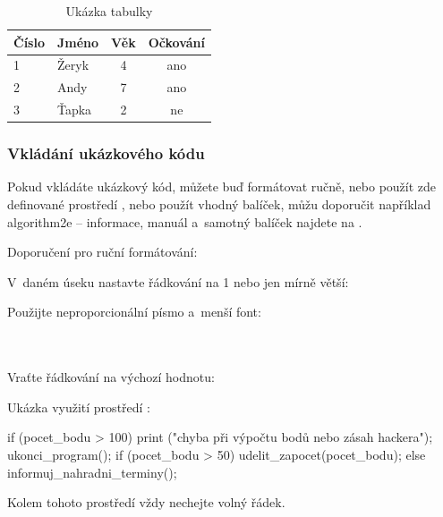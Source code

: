 \begin{table}[htb]
	\centering
	\caption{Ukázka tabulky}
	\medskip
	\radkovani[1.2]
		\begin{tabular}{@{}l||l|c|c@{}}\hline
			\textbf{Číslo} & \textbf{Jméno} & \textbf{Věk} & \textbf{Očkování}\\ \hline\hline
			1	&Žeryk&	4	&ano\\ \hline
			2	&Andy&	7	&ano\\ \hline
			3	&Ťapka&	2	&ne\\ \hline			
		\end{tabular}
	\label{tab:ukazkatabulky}
\end{table}


\subsubsection{Vkládání ukázkového kódu}

Pokud vkládáte ukázkový kód, můžete buď formátovat ručně, nebo použít zde definované prostředí , nebo použít vhodný balíček, můžu doporučit například algorithm2e -- informace, manuál a~samotný balíček najdete na \cite{algorithm2e}.

Doporučení pro ruční formátování:
\begin{citemize}
	\item V~daném úseku nastavte řádkování na 1 nebo jen mírně větší:\\	
	
	\item Použijte neproporcionální písmo a~menší font:\\	
	\\[-2pt]
	\\[-2pt]
	\ttsmall{\}}
	\item Vraťte řádkování na výchozí hodnotu:\\	
\end{citemize}
Ukázka využití prostředí :

\begin{prog}
if (pocet_bodu > 100) {
	print ("chyba při výpočtu bodů nebo zásah hackera");
	ukonci_program();
}
if (pocet_bodu > 50)
	udelit_zapocet(pocet_bodu);
else
	informuj_nahradni_terminy();
\end{prog}

Kolem tohoto prostředí vždy nechejte volný řádek.


